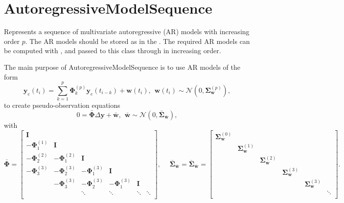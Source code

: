 
\section{AutoregressiveModelSequence}\label{autoregressiveModelSequenceType}
Represents a sequence of multivariate autoregressive (AR) models with increasing order $p$.
The AR models should be stored as  in the .
The required AR models can be computed with ,
and passed to this class through
 in increasing order.

The main purpose of AutoregressiveModelSequence is to use AR models of the form
\begin{equation}
  \label{eq:ar-model}
  \mathbf{y}_e(t_i) = \sum_{k=1}^p \mathbf{\Phi}^{(p)}_k\mathbf{y}_e(t_{i-k}) + \mathbf{w}(t_i),
  \hspace{5pt} \mathbf{w}(t_i) \sim \mathcal{N}(0, \mathbf{\Sigma}^{(p)}_\mathbf{w}),
\end{equation}
to create pseudo-observation equations
\begin{equation}
  \label{eq:pseudo-observations-transformed}
  0 = \bar{\mathbf{\Phi}} \Delta\mathbf{y} + \bar{\mathbf{w}}, \hspace{5pt} \bar{\mathbf{w}} \sim
  \mathcal{N}(0, \bar{\mathbf{\Sigma}}_{\bar{\mathbf{w}}}),
\end{equation}
with
\begin{equation}
  \label{eq:pseudo-observations-ar}
  \bar{\mathbf{\Phi}} =
  \begin{bmatrix}
    \mathbf{I} & & & & & \\
    -\mathbf{\Phi}^{(1)}_1 & \mathbf{I} & & & &  \\
    -\mathbf{\Phi}^{(2)}_2 & -\mathbf{\Phi}^{(2)}_1 & \mathbf{I} & & & \\
    -\mathbf{\Phi}^{(3)}_3 & -\mathbf{\Phi}^ {(3)}_2 & -\mathbf{\Phi}^ {(3)}_1 & \mathbf{I} & &  \\
    & -\mathbf{\Phi}^{(3)}_3 & -\mathbf{\Phi}^ {(3)}_2 & -\mathbf{\Phi}^ {(3)}_1 & \mathbf{I} &  \\
    & & \ddots & \ddots & \ddots & \ddots  \\
  \end{bmatrix},
  \hspace{15pt}
  \bar{\mathbf{\Sigma}}_{\bar{\mathbf{w}}} =
  \bar{\mathbf{\Sigma}}_{\bar{\mathbf{w}}} =
  \begin{bmatrix}
    \mathbf{\Sigma}^{(0)}_{\mathbf{w}} & & & & & \\
    & \mathbf{\Sigma}^{(1)}_{\mathbf{w}} & & & & \\
    & & \mathbf{\Sigma}^{(2)}_{\mathbf{w}} & & & \\
    & & & \mathbf{\Sigma}^{(3)}_{\mathbf{w}} & & \\
    & & & & \mathbf{\Sigma}^{(3)}_{\mathbf{w}} &  \\
    & & & & & \ddots \\
  \end{bmatrix}.
\end{equation}
